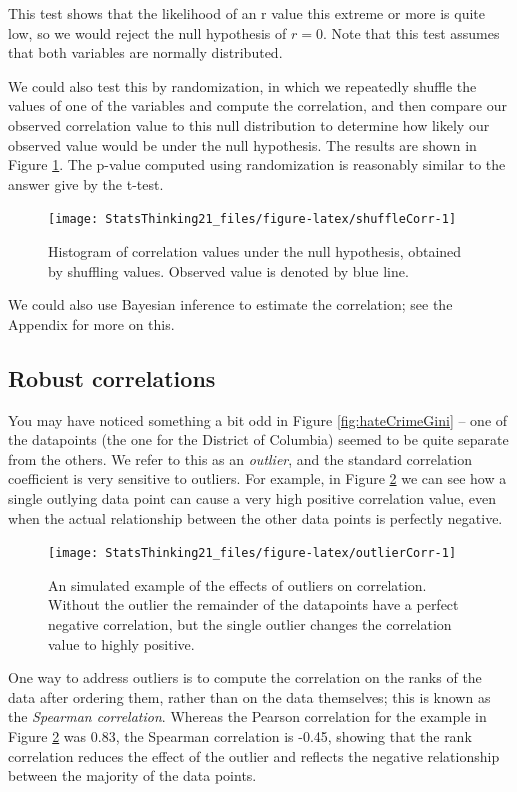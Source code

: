 \documentclass[12pt,]{book}
\theoremstyle{definition}
\theoremstyle{definition}
\theoremstyle{definition}
\theoremstyle{remark}
\begin{document}
This test shows that the likelihood of an r value this extreme or more is quite low, so we would reject the null hypothesis of \(r=0\). Note that this test assumes that both variables are normally distributed.

We could also test this by randomization, in which we repeatedly shuffle the values of one of the variables and compute the correlation, and then compare our observed correlation value to this null distribution to determine how likely our observed value would be under the null hypothesis. The results are shown in Figure \ref{fig:shuffleCorr}. The p-value computed using randomization is reasonably similar to the answer give by the t-test.

\begin{figure}
\texttt{[image: StatsThinking21\_files/figure-latex/shuffleCorr-1]} \caption{Histogram of correlation values under the null hypothesis, obtained by shuffling values. Observed value is denoted by blue line.}\label{fig:shuffleCorr}
\end{figure}

We could also use Bayesian inference to estimate the correlation; see the Appendix for more on this.

\hypertarget{robust-correlations}{%
\subsection{Robust correlations}\label{robust-correlations}}

You may have noticed something a bit odd in Figure \ref{fig:hateCrimeGini} -- one of the datapoints (the one for the District of Columbia) seemed to be quite separate from the others. We refer to this as an \emph{outlier}, and the standard correlation coefficient is very sensitive to outliers. For example, in Figure \ref{fig:outlierCorr} we can see how a single outlying data point can cause a very high positive correlation value, even when the actual relationship between the other data points is perfectly negative.

\begin{figure}
\texttt{[image: StatsThinking21\_files/figure-latex/outlierCorr-1]} \caption{An simulated example of the effects of outliers on correlation.  Without the outlier the remainder of the datapoints have a perfect negative correlation, but the single outlier changes the correlation value to highly positive.}\label{fig:outlierCorr}
\end{figure}

One way to address outliers is to compute the correlation on the ranks of the data after ordering them, rather than on the data themselves; this is known as the \emph{Spearman correlation}. Whereas the Pearson correlation for the example in Figure \ref{fig:outlierCorr} was 0.83, the Spearman correlation is -0.45, showing that the rank correlation reduces the effect of the outlier and reflects the negative relationship between the majority of the data points.
\end{document}
